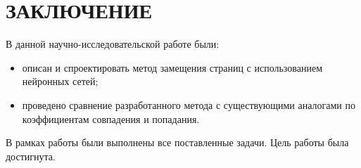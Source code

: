 \chapter*{ЗАКЛЮЧЕНИЕ}

В данной научно-исследовательской работе были:
\begin{itemize}
	\item описан и спроектировать метод замещения страниц с использованием нейронных сетей;
	\item проведено сравнение разработанного метода с существующими аналогами по коэффициентам совпадения и попадания.
\end{itemize}

В рамках работы были выполнены все поставленные задачи. Цель работы была достигнута.